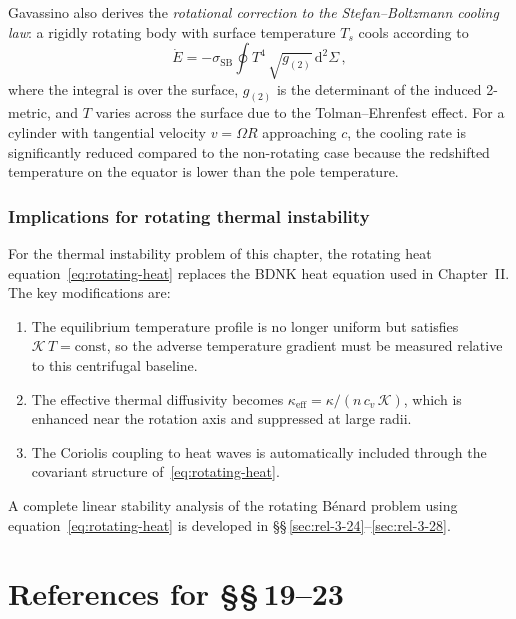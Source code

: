 Gavassino also derives the \emph{rotational correction to the
Stefan--Boltzmann cooling law}: a rigidly rotating body with
surface temperature $T_s$ cools according to
\begin{equation}
  \dot{E} = -\sigma_{\mathrm{SB}}\oint T^4\,\sqrt{g_{(2)}}\,\mathrm{d}^2\Sigma\,,
\end{equation}
where the integral is over the surface, $g_{(2)}$ is the determinant
of the induced 2-metric, and $T$ varies across the surface due to
the Tolman--Ehrenfest effect.  For a cylinder with tangential velocity
$v = \Omega R$ approaching $c$, the cooling rate is significantly
reduced compared to the non-rotating case because the redshifted
temperature on the equator is lower than the pole temperature.

\subsubsection{Implications for rotating thermal instability}
For the thermal instability problem of this chapter, the rotating
heat equation~\eqref{eq:rotating-heat} replaces the BDNK heat
equation used in Chapter~II.  The key modifications are:
\begin{enumerate}
  \item The equilibrium temperature profile is no longer uniform
    but satisfies $\mathcal{K}\,T = \text{const}$, so the adverse
    temperature gradient must be measured relative to this centrifugal
    baseline.
  \item The effective thermal diffusivity becomes
    $\kappa_{\text{eff}} = \kappa/(n\,c_v\,\mathcal{K})$, which is
    enhanced near the rotation axis and suppressed at large radii.
  \item The Coriolis coupling to heat waves is automatically included
    through the covariant structure of~\eqref{eq:rotating-heat}.
\end{enumerate}
A complete linear stability analysis of the rotating B\'enard problem
using equation~\eqref{eq:rotating-heat} is developed in
\S\S\,\ref{sec:rel-3-24}--\ref{sec:rel-3-28}.

\section*{References for \S\S\,19--23}

